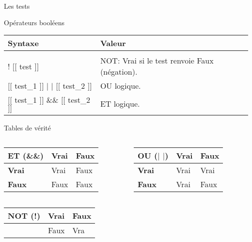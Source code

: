 \begin{frame}{Les tests}
	\begin{block}{Opérateurs booléens}
		\begin{center}
			\begin{tabular}{ll}
				\hline
				Syntaxe&Valeur\\
				\hline\\
				! $[[$ test $]]$&NOT: Vrai si le test renvoie Faux (négation).\\[2pt]
				$[[$ test\_1 $]]$ $|$ $|$ $[[$ test\_2 $]]$&OU logique.\\[2pt]
				$[[$ test\_1 $]]$ \&\& $[[$ test\_2 $]]$&ET logique.\\[2pt]
				\hline
			\end{tabular}
		\end{center}
	\end{block}
	\begin{block}{Tables de vérité}
		\begin{columns}
			\begin{column}{5.5cm}
				\begin{center}
					\begin{tabular}{|l|l|l|}
					\hline
					\textbf{ET (\&\&)}&\textbf{Vrai}&\textbf{Faux}\\
					\hline
					\textbf{Vrai}&Vrai&Faux\\
					\hline
					\textbf{Faux}&Faux&Faux\\
					\hline
					\end{tabular}
				\end{center}
			\end{column}
			\begin{column}{5.5cm}
				\begin{center}
					\begin{tabular}{|l|l|l|}
					\hline
					\textbf{OU ($|$ $|$)}&\textbf{Vrai}&\textbf{Faux}\\
					\hline
					\textbf{Vrai}&Vrai&Vrai\\
					\hline
					\textbf{Faux}&Vrai&Faux\\
					\hline
					\end{tabular}
				\end{center}
			\end{column}
		\end{columns}
				\begin{center}
					\begin{tabular}{|l|l|l|}
					\hline
					\textbf{NOT (!)}&\textbf{Vrai}&\textbf{Faux}\\
					\hline
					&Faux&Vra\\
					\hline
					\end{tabular}
				\end{center}
	\end{block}
\end{frame}

